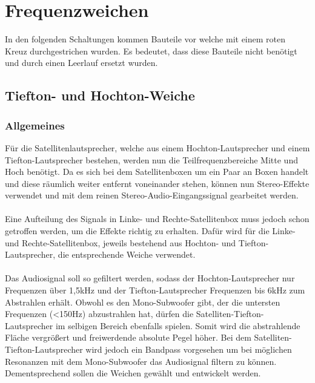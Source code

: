 \newpage
\section{Frequenzweichen}
In den folgenden Schaltungen kommen Bauteile vor welche mit einem roten Kreuz durchgestrichen wurden.
Es bedeutet, dass diese Bauteile nicht benötigt und durch einen Leerlauf ersetzt wurden.
\subsection*{Tiefton- und Hochton-Weiche}\label{sec:4.3}
\subsubsection{Allgemeines}\label{subsec:4.3.1}
Für die Satellitenlautsprecher, welche aus einem Hochton-Lautsprecher und einem Tiefton-Lautsprecher bestehen, werden nun die Teilfrequenzbereiche Mitte und Hoch benötigt.
Da es sich bei dem Satellitenboxen um ein Paar an Boxen handelt und diese räumlich weiter entfernt voneinander stehen, können nun Stereo-Effekte verwendet und mit dem reinen Stereo-Audio-Eingangssignal gearbeitet werden.
\\ \\
Eine Aufteilung des Signals in Linke- und Rechte-Satellitenbox muss jedoch schon getroffen werden, um die Effekte richtig zu erhalten.
Dafür wird für die Linke- und Rechte-Satellitenbox, jeweils bestehend aus Hochton- und Tiefton-Lautsprecher, die entsprechende Weiche verwendet.
\\ \\
Das Audiosignal soll so gefiltert werden, sodass der Hochton-Lautsprecher nur Frequenzen über 1,5kHz und der Tiefton-Lautsprecher Frequenzen bis 6kHz zum Abstrahlen erhält.
Obwohl es den Mono-Subwoofer gibt, der die untersten Frequenzen (<150Hz) abzustrahlen hat, dürfen die Satelliten-Tiefton-Lautsprecher im selbigen Bereich ebenfalls spielen.
Somit wird die abstrahlende Fläche vergrößert und freiwerdende absolute Pegel höher.
Bei dem Satelliten-Tiefton-Lautsprecher wird jedoch ein Bandpass vorgesehen um bei möglichen Resonanzen mit dem Mono-Subwoofer das Audiosignal filtern zu können.
\\
Dementsprechend sollen die Weichen gewählt und entwickelt werden.
\\

